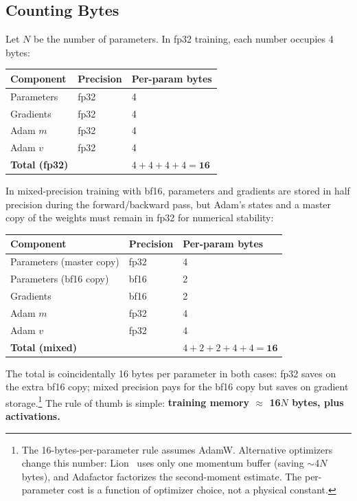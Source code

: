 \subsection{Counting Bytes}

Let $N$ be the number of parameters. In fp32 training, each number occupies 4 bytes:

\begin{center}
\begin{tabular}{lll}
\toprule
\textbf{Component} & \textbf{Precision} & \textbf{Per-param bytes} \\
\midrule
Parameters          & fp32              & 4 \\
Gradients           & fp32              & 4 \\
Adam $m$            & fp32              & 4 \\
Adam $v$            & fp32              & 4 \\
\midrule
\textbf{Total (fp32)} &                   & $4+4+4+4 = \mathbf{16}$ \\
\bottomrule
\end{tabular}
\end{center}

In mixed-precision training with bf16, parameters and gradients are stored in half precision during the forward/backward pass, but Adam's states and a master copy of the weights must remain in fp32 for numerical stability:

\begin{center}
\begin{tabular}{lll}
\toprule
\textbf{Component} & \textbf{Precision} & \textbf{Per-param bytes} \\
\midrule
Parameters (master copy)  & fp32   & 4 \\
Parameters (bf16 copy)    & bf16   & 2 \\
Gradients                 & bf16   & 2 \\
Adam $m$                  & fp32   & 4 \\
Adam $v$                  & fp32   & 4 \\
\midrule
\textbf{Total (mixed)} &        & $4+2+2+4+4 = \mathbf{16}$ \\
\bottomrule
\end{tabular}
\end{center}

The total is coincidentally 16 bytes per parameter in both cases: fp32 saves on the extra bf16 copy; mixed precision pays for the bf16 copy but saves on gradient storage.\footnote{The 16-bytes-per-parameter rule assumes AdamW. Alternative optimizers change this number: Lion~\cite{chen2024lion} uses only one momentum buffer (saving $\sim$4$N$ bytes), and Adafactor factorizes the second-moment estimate. The per-parameter cost is a function of optimizer choice, not a physical constant.} The rule of thumb is simple: \textbf{training memory $\approx$ 16$N$ bytes, plus activations.}

